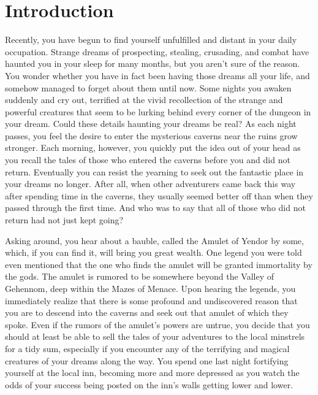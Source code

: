 \section{Introduction}


Recently, you have begun to find yourself unfulfilled and distant 
in your daily occupation.  Strange dreams of prospecting, stealing, 
crusading, and combat have haunted you in your sleep for many months, 
but you aren't sure of the reason.  You wonder whether you have in 
fact been having those dreams all your life, and somehow managed to 
forget about them until now.  Some nights you awaken suddenly
and cry out, terrified at the vivid recollection of the strange and 
powerful creatures that seem to be lurking behind every corner of the 
dungeon in your dream.  Could these details haunting your dreams be real?  
As each night passes, you feel the desire to enter the mysterious caverns 
near the ruins grow stronger.  Each morning, however, you quickly put 
the idea out of your head as you recall the tales of those who entered 
the caverns before you and did not return.  Eventually you can resist 
the yearning to seek out the fantastic place in your dreams no longer.  
After all, when other adventurers came back this way after spending time 
in the caverns, they usually seemed better off than when they passed 
through the first time.  And who was to say that all of those who did 
not return had not just kept going?

Asking around, you hear about a bauble, called the Amulet of Yendor by some,
which, if you can find it, will bring you great wealth.  One legend you were
told even mentioned that the one who finds the amulet will be granted
immortality by the gods.  The amulet is rumored to be somewhere beyond the
Valley of Gehennom, deep within the Mazes of Menace.  Upon hearing the
legends, you immediately realize that there is some profound and 
undiscovered reason that you are to descend into the caverns and seek 
out that amulet of which they spoke.  Even if the rumors of the amulet's 
powers are untrue, you decide that you should at least be able to sell the 
tales of your adventures to the local minstrels for a tidy sum, especially 
if you encounter any of the terrifying and magical creatures of 
your dreams along the way.  You spend one last night fortifying yourself 
at the local inn, becoming more and more depressed as you watch the odds 
of your success being posted on the inn's walls getting lower and lower.  

